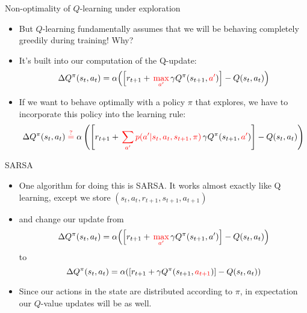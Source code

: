 \documentclass{beamer}
\begin{document}
\begin{frame}{Non-optimality of \(Q\)-learning under exploration}
\begin{itemize}
    \item But \(Q\)-learning fundamentally assumes that we will be behaving completely greedily during training! Why?
    \item<2-> It's built into our computation of the Q-update: 
        \[\Delta Q^{\pi}(s_{t}, a_t) = \alpha {\left( \left[ r_{t+1} + \, {\color{red} \max_{a'}} \, \gamma Q^{\pi}(s_{t+1}, {\color{red}a'}) \right] - Q(s_t, a_t)\right)}\]
    \item<3-> If we want to behave optimally with a policy \(\pi\) that explores, we have to incorporate this policy into the learning rule:
        {\footnotesize \[\Delta Q^{\pi}(s_{t}, a_t) \; {\color{red} \stackrel{?}{=}} \; \alpha \left( \left[ r_{t+1} + \, {\color{red} \sum_{a'} p(a' | s_t, a_t, s_{t+1}, \pi)} \, \gamma Q^{\pi}(s_{t+1}, {\color{red} a'}) \right] - Q(s_t, a_t)\right)\]}
\end{itemize}
\end{frame}


\begin{frame}{SARSA}
\begin{itemize}
    \item One algorithm for doing this is SARSA. It works almost exactly like Q learning, except we store \((s_t, a_t, r_{t+1}, s_{t+1}, a_{t+1})\)
    \item<2-> and change our update from 
        \[\Delta Q^{\pi}(s_{t}, a_t) = \alpha {\left( \left[ r_{t+1} + \, {\color{red} \max_{a'}} \, \gamma Q^{\pi}(s_{t+1}, a') \right] - Q(s_t, a_t)\right)}\]
        to
        \[\Delta Q^{\pi}(s_{t}, a_t) = \alpha {\left( \left[ r_{t+1} + \gamma Q^{\pi}(s_{t+1}, {\color{red} a_{t+1}}) \right] - Q(s_t, a_t)\right)}\]
    \item<3-> Since our actions in the state are distributed according to \(\pi\), in expectation our \(Q\)-value updates will be as well.
\end{itemize}
\end{frame}
\end{document}
